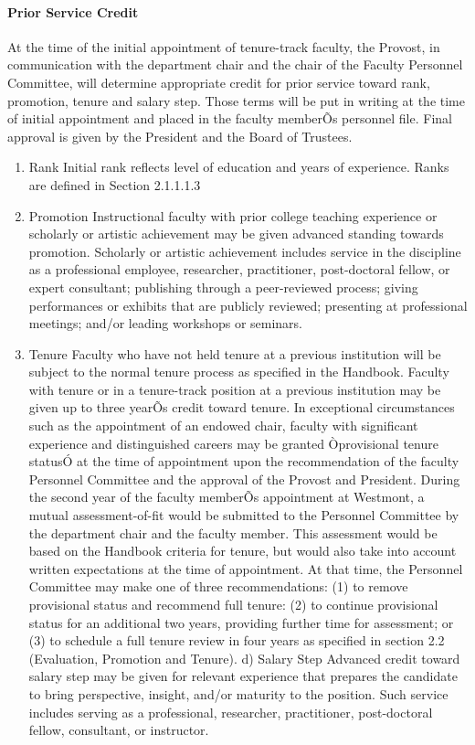 \documentclass[letterpaper, 11pt]{article}
\begin{document}
			\paragraph{Prior Service Credit}
				At the time of the initial appointment of tenure-track faculty, the Provost, in communication with the department chair and the chair of the Faculty Personnel Committee, will determine appropriate credit for prior service toward rank, promotion, tenure and salary step.  Those terms will be put in writing at the time of initial appointment and placed in the faculty memberÕs personnel file.  Final approval is given by the President and the Board of Trustees.
				\begin{enumerate}[label=\alph*)]
					\item{Rank Initial rank reflects level of education and years of experience.  Ranks are defined in Section 2.1.1.1.3}
					\item{Promotion Instructional faculty with prior college teaching experience or scholarly or artistic achievement may be given advanced standing towards promotion.  Scholarly or artistic achievement includes service in the discipline as a professional employee, researcher, practitioner, post-doctoral fellow, or expert consultant; publishing through a peer-reviewed process; giving performances or exhibits that are publicly reviewed; presenting at professional meetings; and/or leading workshops or seminars.}
					\item{Tenure Faculty who have not held tenure at a previous institution will be subject to the normal tenure process as specified in the Handbook.  Faculty with tenure or in a tenure-track position at a previous institution may be given up to three yearÕs credit toward tenure.}
					In exceptional circumstances such as the appointment of an endowed chair, faculty with significant experience and distinguished careers may be granted Òprovisional tenure statusÓ at the time of appointment upon the recommendation of the faculty Personnel Committee and the approval of the Provost and President.  During the second year of the faculty memberÕs appointment at Westmont, a mutual assessment-of-fit would be submitted to the Personnel Committee by the department chair and the faculty member.  This assessment would be based on the Handbook criteria for tenure, but would also take into account written expectations at the time of appointment.  At that time, the Personnel Committee may make one of three recommendations: (1) to remove provisional status and recommend full tenure: (2) to continue provisional status for an additional two years, providing further time for assessment; or (3) to schedule a full tenure review in four years as specified in section 2.2 (Evaluation, Promotion and Tenure).
					d)	Salary Step Advanced credit toward salary step may be given for relevant experience that prepares the candidate to bring perspective, insight, and/or maturity to the position.  Such service includes serving as a professional, researcher, practitioner, post-doctoral fellow, consultant, or instructor.

				\end{enumerate}
\end{document}
